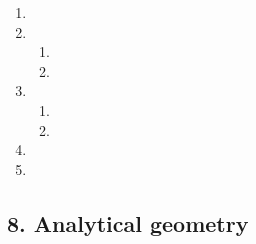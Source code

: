 \begin{multicols}{3}
\begin{enumerate}[noitemsep, label=\textbf{\arabic*}. ]
\item %
\item %
\begin{enumerate}[noitemsep, label=\textbf{(\alph*)} ]
\item %
\item %
\end{enumerate} 
\item %
\begin{enumerate}[noitemsep, label=\textbf{(\alph*)} ] 
\item %
\item %
\end{enumerate} 
\item %
\item %

\end{enumerate}
\end{multicols}

\subsection* {8. Analytical geometry}
